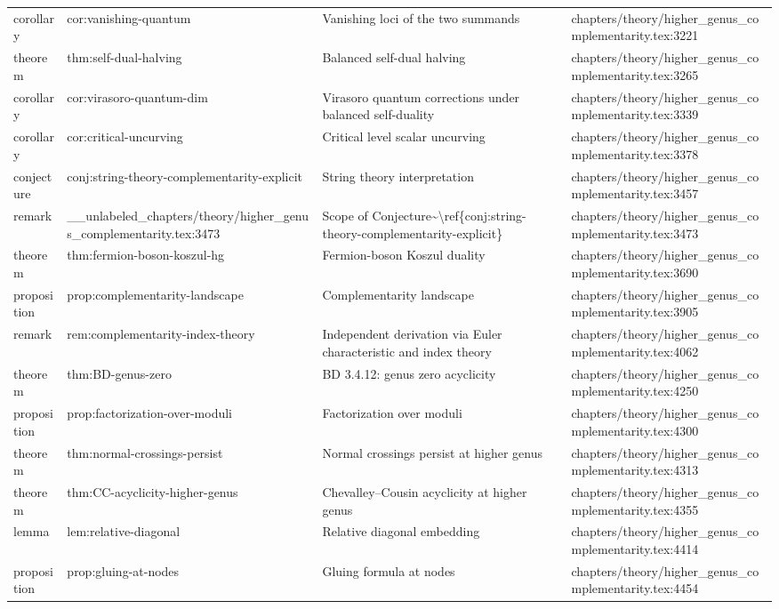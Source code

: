 \documentclass[11pt]{article}
\begin{document}
\begin{longtable}{L{0.10\textwidth}L{0.26\textwidth}L{0.42\textwidth}L{0.22\textwidth}}
corollary & cor:vanishing-quantum & Vanishing loci of the two summands & chapters/theory/higher\_genus\_complementarity.tex:3221\\
theorem & thm:self-dual-halving & Balanced self-dual halving & chapters/theory/higher\_genus\_complementarity.tex:3265\\
corollary & cor:virasoro-quantum-dim & Virasoro quantum corrections under balanced self-duality & chapters/theory/higher\_genus\_complementarity.tex:3339\\
corollary & cor:critical-uncurving & Critical level scalar uncurving & chapters/theory/higher\_genus\_complementarity.tex:3378\\
conjecture & conj:string-theory-complementarity-explicit & String theory interpretation & chapters/theory/higher\_genus\_complementarity.tex:3457\\
remark & \_\_unlabeled\_chapters/theory/higher\_genus\_complementarity.tex:3473 & Scope of Conjecture\textasciitilde{}\textbackslash{}ref\{conj:string-theory-complementarity-explicit\} & chapters/theory/higher\_genus\_complementarity.tex:3473\\
theorem & thm:fermion-boson-koszul-hg & Fermion-boson Koszul duality & chapters/theory/higher\_genus\_complementarity.tex:3690\\
proposition & prop:complementarity-landscape & Complementarity landscape & chapters/theory/higher\_genus\_complementarity.tex:3905\\
remark & rem:complementarity-index-theory & Independent derivation via Euler characteristic and index theory & chapters/theory/higher\_genus\_complementarity.tex:4062\\
theorem & thm:BD-genus-zero & BD 3.4.12: genus zero acyclicity & chapters/theory/higher\_genus\_complementarity.tex:4250\\
proposition & prop:factorization-over-moduli & Factorization over moduli & chapters/theory/higher\_genus\_complementarity.tex:4300\\
theorem & thm:normal-crossings-persist & Normal crossings persist at higher genus & chapters/theory/higher\_genus\_complementarity.tex:4313\\
theorem & thm:CC-acyclicity-higher-genus & Chevalley--Cousin acyclicity at higher genus & chapters/theory/higher\_genus\_complementarity.tex:4355\\
lemma & lem:relative-diagonal & Relative diagonal embedding & chapters/theory/higher\_genus\_complementarity.tex:4414\\
proposition & prop:gluing-at-nodes & Gluing formula at nodes & chapters/theory/higher\_genus\_complementarity.tex:4454\\

\end{longtable}
\end{document}

